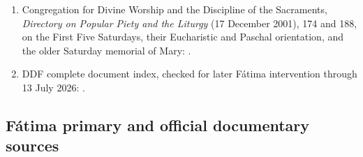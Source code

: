 \begin{enumerate}
  \item Congregation for Divine Worship and the Discipline of the Sacraments, \emph{Directory on Popular Piety and the Liturgy} (17 December 2001), 174 and 188, on the First Five Saturdays, their Eucharistic and Paschal orientation, and the older Saturday memorial of Mary: .
  \item DDF complete document index, checked for later Fátima intervention through 13 July 2026: .
\end{enumerate}

\subsection{Fátima primary and official documentary sources}

